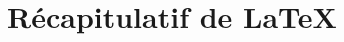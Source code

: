 \documentclass{beamer}
\subtitle{Partie 3 : au-delà des articles --- présentations \& plus}
\begin{document}
\begin{frame}
\titlepage
\end{frame}


\section{Récapitulatif de \LaTeX{}}
\end{document}
